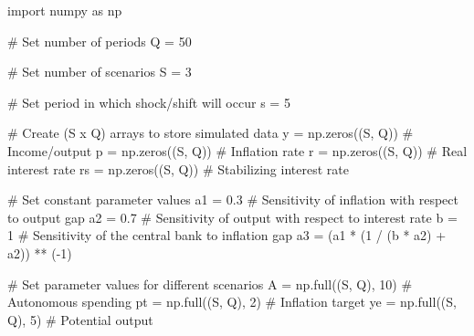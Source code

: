\documentclass[
  letterpaper,
  DIV=11,
  numbers=noendperiod]{scrreprt}
\newenvironment{Shaded}{\begin{snugshade}}{\end{snugshade}}
\newcommand{\CommentTok}[1]{\textcolor[rgb]{0.37,0.37,0.37}{#1}}
\newcommand{\DecValTok}[1]{\textcolor[rgb]{0.68,0.00,0.00}{#1}}
\newcommand{\FloatTok}[1]{\textcolor[rgb]{0.68,0.00,0.00}{#1}}
\newcommand{\ImportTok}[1]{\textcolor[rgb]{0.00,0.46,0.62}{#1}}
\newcommand{\NormalTok}[1]{\textcolor[rgb]{0.00,0.23,0.31}{#1}}
\newcommand{\OperatorTok}[1]{\textcolor[rgb]{0.37,0.37,0.37}{#1}}
\begin{document}
\begin{tcolorbox}[enhanced jigsaw, titlerule=0mm, breakable, bottomrule=.15mm, toprule=.15mm, colbacktitle=quarto-callout-note-color!10!white, rightrule=.15mm, toptitle=1mm, opacityback=0, left=2mm, coltitle=black, title=\textcolor{quarto-callout-note-color}{\faInfo}\hspace{0.5em}{Python code}, colframe=quarto-callout-note-color-frame, opacitybacktitle=0.6, leftrule=.75mm, bottomtitle=1mm, arc=.35mm, colback=white]

\begin{Shaded}
\begin{Highlighting}[]
\ImportTok{import}\NormalTok{ numpy }\ImportTok{as}\NormalTok{ np}

\CommentTok{\# Set number of periods}
\NormalTok{Q }\OperatorTok{=} \DecValTok{50}

\CommentTok{\# Set number of scenarios}
\NormalTok{S }\OperatorTok{=} \DecValTok{3}

\CommentTok{\# Set period in which shock/shift will occur}
\NormalTok{s }\OperatorTok{=} \DecValTok{5}

\CommentTok{\# Create (S x Q) arrays to store simulated data}
\NormalTok{y }\OperatorTok{=}\NormalTok{ np.zeros((S, Q))  }\CommentTok{\# Income/output}
\NormalTok{p }\OperatorTok{=}\NormalTok{ np.zeros((S, Q))  }\CommentTok{\# Inflation rate}
\NormalTok{r }\OperatorTok{=}\NormalTok{ np.zeros((S, Q))  }\CommentTok{\# Real interest rate}
\NormalTok{rs }\OperatorTok{=}\NormalTok{ np.zeros((S, Q))  }\CommentTok{\# Stabilizing interest rate}

\CommentTok{\# Set constant parameter values}
\NormalTok{a1 }\OperatorTok{=} \FloatTok{0.3}  \CommentTok{\# Sensitivity of inflation with respect to output gap}
\NormalTok{a2 }\OperatorTok{=} \FloatTok{0.7}  \CommentTok{\# Sensitivity of output with respect to interest rate}
\NormalTok{b }\OperatorTok{=} \DecValTok{1}     \CommentTok{\# Sensitivity of the central bank to inflation gap}
\NormalTok{a3 }\OperatorTok{=}\NormalTok{ (a1 }\OperatorTok{*}\NormalTok{ (}\DecValTok{1} \OperatorTok{/}\NormalTok{ (b }\OperatorTok{*}\NormalTok{ a2) }\OperatorTok{+}\NormalTok{ a2)) }\OperatorTok{**}\NormalTok{ (}\OperatorTok{{-}}\DecValTok{1}\NormalTok{)}

\CommentTok{\# Set parameter values for different scenarios}
\NormalTok{A }\OperatorTok{=}\NormalTok{ np.full((S, Q), }\DecValTok{10}\NormalTok{)  }\CommentTok{\# Autonomous spending}
\NormalTok{pt }\OperatorTok{=}\NormalTok{ np.full((S, Q), }\DecValTok{2}\NormalTok{)  }\CommentTok{\# Inflation target}
\NormalTok{ye }\OperatorTok{=}\NormalTok{ np.full((S, Q), }\DecValTok{5}\NormalTok{)  }\CommentTok{\# Potential output}


\end{Highlighting}
\end{Shaded}
\end{tcolorbox}
\end{document}
